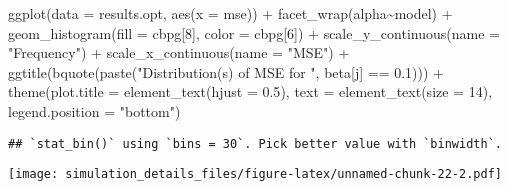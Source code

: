 \documentclass[
]{article}
\newenvironment{Shaded}{\begin{snugshade}}{\end{snugshade}}
\newcommand{\AttributeTok}[1]{\textcolor[rgb]{0.77,0.63,0.00}{#1}}
\newcommand{\DecValTok}[1]{\textcolor[rgb]{0.00,0.00,0.81}{#1}}
\newcommand{\FloatTok}[1]{\textcolor[rgb]{0.00,0.00,0.81}{#1}}
\newcommand{\FunctionTok}[1]{\textcolor[rgb]{0.00,0.00,0.00}{#1}}
\newcommand{\NormalTok}[1]{#1}
\newcommand{\SpecialCharTok}[1]{\textcolor[rgb]{0.00,0.00,0.00}{#1}}
\newcommand{\StringTok}[1]{\textcolor[rgb]{0.31,0.60,0.02}{#1}}
\begin{document}
\begin{Shaded}
\begin{Highlighting}[]
\FunctionTok{ggplot}\NormalTok{(}\AttributeTok{data =}\NormalTok{ results.opt,}
       \FunctionTok{aes}\NormalTok{(}\AttributeTok{x =}\NormalTok{ mse)) }\SpecialCharTok{+}
  \FunctionTok{facet\_wrap}\NormalTok{(alpha}\SpecialCharTok{\textasciitilde{}}\NormalTok{model) }\SpecialCharTok{+}
  \FunctionTok{geom\_histogram}\NormalTok{(}\AttributeTok{fill =}\NormalTok{ cbpg[}\DecValTok{8}\NormalTok{], }\AttributeTok{color =}\NormalTok{ cbpg[}\DecValTok{6}\NormalTok{]) }\SpecialCharTok{+}
  \FunctionTok{scale\_y\_continuous}\NormalTok{(}\AttributeTok{name =} \StringTok{"Frequency"}\NormalTok{) }\SpecialCharTok{+}
  \FunctionTok{scale\_x\_continuous}\NormalTok{(}\AttributeTok{name =} \StringTok{"MSE"}\NormalTok{) }\SpecialCharTok{+}
  \FunctionTok{ggtitle}\NormalTok{(}\FunctionTok{bquote}\NormalTok{(}\FunctionTok{paste}\NormalTok{(}\StringTok{"Distribution(s) of MSE for "}\NormalTok{, beta[j] }\SpecialCharTok{==} \FloatTok{0.1}\NormalTok{))) }\SpecialCharTok{+}
  \FunctionTok{theme}\NormalTok{(}\AttributeTok{plot.title =} \FunctionTok{element\_text}\NormalTok{(}\AttributeTok{hjust =} \FloatTok{0.5}\NormalTok{), }
        \AttributeTok{text =} \FunctionTok{element\_text}\NormalTok{(}\AttributeTok{size =} \DecValTok{14}\NormalTok{),}
        \AttributeTok{legend.position =} \StringTok{"bottom"}\NormalTok{)}
\end{Highlighting}
\end{Shaded}

\begin{verbatim}
## `stat_bin()` using `bins = 30`. Pick better value with `binwidth`.
\end{verbatim}

\texttt{[image: simulation\_details\_files/figure-latex/unnamed-chunk-22-2.pdf]}
\end{document}
